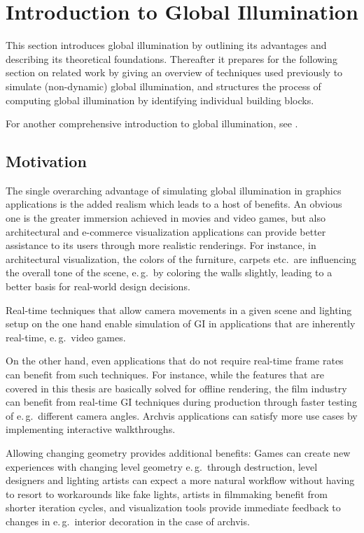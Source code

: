 \section{Introduction to Global Illumination}

This section introduces global illumination by outlining its advantages and describing its theoretical foundations. Thereafter it prepares for the following section on related work by giving an overview of techniques used previously to simulate (non-dynamic) global illumination, and structures the process of computing global illumination by identifying individual building blocks.

For another comprehensive introduction to global illumination, see \citet{Ritschel:2012:GISTAR}.

\subsection{Motivation}
The single overarching advantage of simulating global illumination in graphics applications is the added realism which leads to a host of benefits. An obvious one is the greater immersion achieved in movies and video games, but also architectural and e-commerce visualization applications can provide better assistance to its users through more realistic renderings. For instance, in architectural visualization, the colors of the furniture, carpets etc.\ are influencing the overall tone of the scene, e.\,g.\ by coloring the walls slightly, leading to a better basis for real-world design decisions.

Real-time techniques that allow camera movements in a given scene and lighting setup on the one hand enable simulation of GI in applications that are inherently real-time, e.\,g.\ video games.

On the other hand, even applications that do not require real-time frame rates can benefit from such techniques. For instance, while the features that are covered in this thesis are basically solved for offline rendering, the film industry can benefit from real-time GI techniques during production through faster testing of e.\,g.\ different camera angles. Archvis applications can satisfy more use cases by implementing interactive walkthroughs.

Allowing changing geometry provides additional benefits: Games can create new experiences with changing level geometry e.\,g.\ through destruction, level designers and lighting artists can expect a more natural workflow without having to resort to workarounds like fake lights, artists in filmmaking benefit from shorter iteration cycles, and visualization tools provide immediate feedback to changes in e.\,g.\ interior decoration in the case of archvis.


